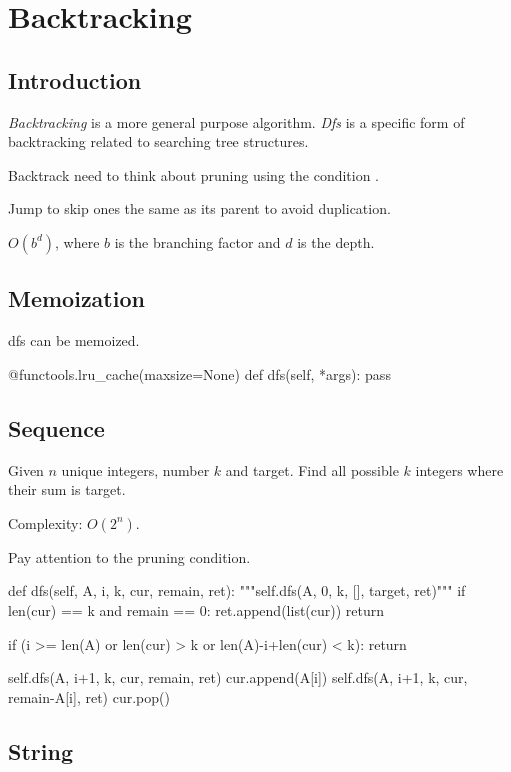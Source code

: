 \chapter{Backtracking}
\section{Introduction}
 \textit{Backtracking} is a more general purpose algorithm. \textit{Dfs} is a specific form of backtracking related to searching tree structures. 

 Backtrack need to think about pruning using the condition .

 Jump to skip ones the same as its parent to avoid duplication.

 $O(b^d)$, where $b$ is the branching factor and $d$ is the depth. 


\section{Memoization}
dfs can be memoized.
\begin{python}
@functools.lru_cache(maxsize=None)
def dfs(self, *args):
  pass
\end{python}
\section{Sequence}
 Given $n$ unique integers, number $k$ and target. Find all possible $k$ integers where their sum is target. 

Complexity: $O(2^n)$.

Pay attention to the pruning condition.

\begin{python}
def dfs(self, A, i, k, cur, remain, ret):
    """self.dfs(A, 0, k, [], target, ret)"""
    if len(cur) == k and remain == 0:
        ret.append(list(cur))
        return

    if (i >= len(A) or len(cur) > k 
        or len(A)-i+len(cur) < k):
        return

    self.dfs(A, i+1, k, cur, remain, ret)
    cur.append(A[i])
    self.dfs(A, i+1, k, cur, remain-A[i], ret)
    cur.pop()
\end{python}


\section{String}
